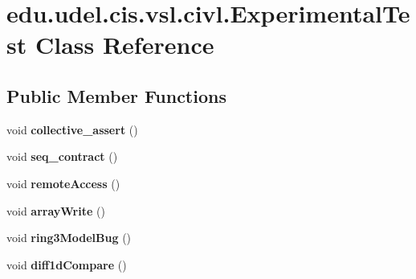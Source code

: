 \hypertarget{classedu_1_1udel_1_1cis_1_1vsl_1_1civl_1_1ExperimentalTest}{}\section{edu.\+udel.\+cis.\+vsl.\+civl.\+Experimental\+Test Class Reference}
\label{classedu_1_1udel_1_1cis_1_1vsl_1_1civl_1_1ExperimentalTest}
\subsection*{Public Member Functions}
\begin{DoxyCompactItemize}
\item 
\hypertarget{classedu_1_1udel_1_1cis_1_1vsl_1_1civl_1_1ExperimentalTest_a0e9cae12acdd4a61b0fa9fe74b910c54}{}void {\bfseries collective\+\_\+assert} ()\label{classedu_1_1udel_1_1cis_1_1vsl_1_1civl_1_1ExperimentalTest_a0e9cae12acdd4a61b0fa9fe74b910c54}

\item 
\hypertarget{classedu_1_1udel_1_1cis_1_1vsl_1_1civl_1_1ExperimentalTest_a3695bf2bd78a0eb6a4429c81aa8f4e6b}{}void {\bfseries seq\+\_\+contract} ()\label{classedu_1_1udel_1_1cis_1_1vsl_1_1civl_1_1ExperimentalTest_a3695bf2bd78a0eb6a4429c81aa8f4e6b}

\item 
\hypertarget{classedu_1_1udel_1_1cis_1_1vsl_1_1civl_1_1ExperimentalTest_af8af55b2e1740cba69560d03c1bf686d}{}void {\bfseries remote\+Access} ()\label{classedu_1_1udel_1_1cis_1_1vsl_1_1civl_1_1ExperimentalTest_af8af55b2e1740cba69560d03c1bf686d}

\item 
\hypertarget{classedu_1_1udel_1_1cis_1_1vsl_1_1civl_1_1ExperimentalTest_a54c6ecb0d2e5b73ffc63921e4cd1648b}{}void {\bfseries array\+Write} ()\label{classedu_1_1udel_1_1cis_1_1vsl_1_1civl_1_1ExperimentalTest_a54c6ecb0d2e5b73ffc63921e4cd1648b}

\item 
\hypertarget{classedu_1_1udel_1_1cis_1_1vsl_1_1civl_1_1ExperimentalTest_a8ee2f6ad030426e3de084cb763196109}{}void {\bfseries ring3\+Model\+Bug} ()\label{classedu_1_1udel_1_1cis_1_1vsl_1_1civl_1_1ExperimentalTest_a8ee2f6ad030426e3de084cb763196109}

\item 
\hypertarget{classedu_1_1udel_1_1cis_1_1vsl_1_1civl_1_1ExperimentalTest_a5e9c8988934cc575a74ca307c15c729a}{}void {\bfseries diff1d\+Compare} ()\label{classedu_1_1udel_1_1cis_1_1vsl_1_1civl_1_1ExperimentalTest_a5e9c8988934cc575a74ca307c15c729a}


\end{DoxyCompactItemize}
